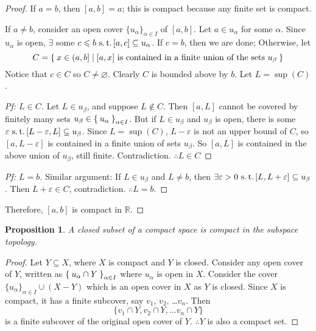 \documentclass[12pt]{amsart}
\newcommand{\bbR}{\mathbb{R}}
\newcommand{\suchthat}{\operatorname{\thinspace s.t. \thinspace}}
\theoremstyle{plain}
\newtheorem*{prop}{Proposition}
\theoremstyle{remark}
\theoremstyle{definition}
\begin{document}
\begin{proof}
If $a = b$, then $[a, b] = {a}$; this is compact because any finite set is compact.
\par
If $a \neq b$, consider an open cover $\{u_{\alpha}\}_{\alpha \in I}$ of $[a, b]$. Let $a \in u_{\alpha}$ for some $\alpha$. Since $u_{\alpha}$ is open, $\exists$ some $c \leqslant b \suchthat [a, c] \subseteq u_{\alpha}$. If $c = b$, then we are done; Otherwise, let 
\begin{equation*}
C = \Set{x \in (a, b] | [a, x] \text{ is contained in a finite union of the sets } u_{\beta}}
\end{equation*}
Notice that $c \in C$ so $C \neq \varnothing$. Clearly $C$ is bounded above by $b$. Let $L = \sup(C)$.

\begin{proof}[Pf: $L \in C$]
\hfill
\newline
Let $L \in u_{\beta}$, and suppose $L\notin C$. Then $[a, L]$ cannot be covered by finitely many sets $u_{\beta} \in \Set{u_{\alpha}}_{\alpha \in I}$. But if $L \in u_{\beta}$ and $u_{\beta}$ is open, there is some $\varepsilon \suchthat [L - \varepsilon, L] \subseteq u_{\beta}$. Since $L = \sup(C)$, $L-\varepsilon$ is not an upper bound of $C$, so $[a, L-\varepsilon]$ is contained in a finite union of sets $u_{\beta}$. So $[a, L]$ is contained in the above union of $u_{\beta}$, still finite. Contradiction.
\newline
$\therefore L \in C$
\end{proof}

\begin{proof}[Pf: $L=b$]
\hfill
\newline
Similar argument: If $L \in u_{\beta}$ and $L \neq b$, then $\exists \varepsilon > 0 \suchthat [L, L+\varepsilon] \subseteq u_{\beta}$. Then $L + \varepsilon \in C$, contradiction.
\newline
$\therefore L = b$.
\end{proof}
Therefore, $[a, b]$ is compact in $\bbR$.
\end{proof}

\begin{prop}
A closed subset of a compact space is compact in the subspace topology.
\end{prop}
\begin{proof}
Let $Y \subseteq X$, where $X$ is compact and $Y$ is closed. Consider any open cover of $Y$, written as $\Set{u_{\alpha} \cap Y}_{\alpha \in I}$ where $u_{\alpha}$ is open in $X$. Consider the cover $\{u_{\alpha}\}_{\alpha \in I} \cup (X-Y)$ which is an open cover in $X$ as $Y$ is closed. Since $X$ is compact, it has a finite subcover, say $v_1$, $v_2$, \dots $v_n$. Then 
\begin{equation*}
\{v_1\cap Y,v_2\cap Y,\dots v_n\cap Y\}
\end{equation*}
 is a finite subcover of the original open cover of $Y$.
\newline
$\therefore Y$ is also a compact set. 
\end{proof}
\end{document}
